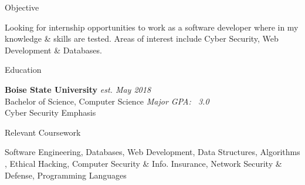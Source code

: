 \documentclass{resume}
\begin{document}

\begin{rSection}{Objective}

Looking for internship opportunities to work as a software developer where in my knowledge \& skills are tested. 
Areas of interest include Cyber Security, Web Development \& Databases.

\end{rSection}


\begin{rSection}{Education}

{\bf Boise State University} \hfill {\em est. May 2018}\\
Bachelor of Science, Computer Science \hfill {\em Major GPA: ~3.0}\\
Cyber Security Emphasis\\ 
\end{rSection}

\begin{rSection}{Relevant Coursework}

Software Engineering, Databases, Web Development, Data Structures, Algorithms ,
 Ethical Hacking, Computer Security \& Info. Insurance, Network Security \& Defense, Programming Languages

\end{rSection}

\end{document}
